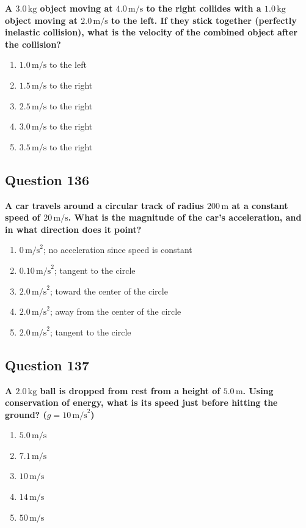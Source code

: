 \documentclass[12pt,letterpaper]{article}
\begin{document}
\begin{questionbox}
\textbf{A $3.0\,\text{kg}$ object moving at $4.0\,\text{m/s}$ to the right collides with a $1.0\,\text{kg}$ object moving at $2.0\,\text{m/s}$ to the left. If they stick together (perfectly inelastic collision), what is the velocity of the combined object after the collision?}

\begin{enumerate}[label=\alph*)]
    \item $1.0\,\text{m/s}$ to the left
    \item $1.5\,\text{m/s}$ to the right
    \item $2.5\,\text{m/s}$ to the right
    \item $3.0\,\text{m/s}$ to the right
    \item $3.5\,\text{m/s}$ to the right
\end{enumerate}
\end{questionbox}

\subsection{Question 136}

\begin{questionbox}
\textbf{A car travels around a circular track of radius $200\,\text{m}$ at a constant speed of $20\,\text{m/s}$. What is the magnitude of the car's acceleration, and in what direction does it point?}

\begin{enumerate}[label=\alph*)]
    \item $0\,\text{m/s}^2$; no acceleration since speed is constant
    \item $0.10\,\text{m/s}^2$; tangent to the circle
    \item $2.0\,\text{m/s}^2$; toward the center of the circle
    \item $2.0\,\text{m/s}^2$; away from the center of the circle
    \item $2.0\,\text{m/s}^2$; tangent to the circle
\end{enumerate}
\end{questionbox}

\subsection{Question 137}

\begin{questionbox}
\textbf{A $2.0\,\text{kg}$ ball is dropped from rest from a height of $5.0\,\text{m}$. Using conservation of energy, what is its speed just before hitting the ground? ($g = 10\,\text{m/s}^2$)}

\begin{enumerate}[label=\alph*)]
    \item $5.0\,\text{m/s}$
    \item $7.1\,\text{m/s}$
    \item $10\,\text{m/s}$
    \item $14\,\text{m/s}$
    \item $50\,\text{m/s}$
\end{enumerate}
\end{questionbox}
\end{document}
